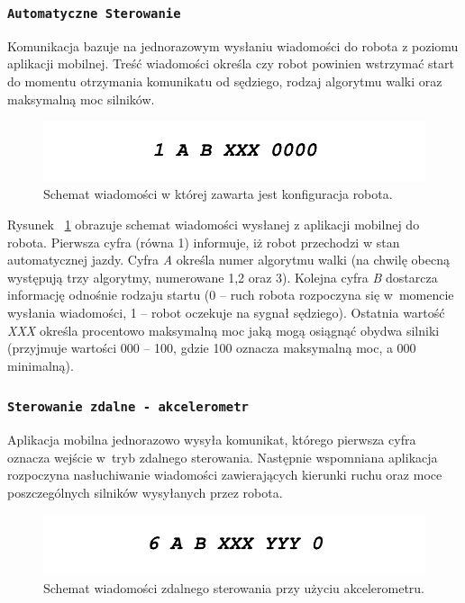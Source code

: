  \subsubsection{\lstinline$Automatyczne Sterowanie$}

Komunikacja bazuje na jednorazowym wysłaniu wiadomości do robota z poziomu aplikacji mobilnej. Treść wiadomości określa czy robot powinien wstrzymać start do momentu otrzymania komunikatu od sędziego, rodzaj algorytmu walki oraz maksymalną moc silników.

\begin{figure}[H]
	\centering
		\includegraphics[width=0.75\linewidth]{pic03/automatic.pdf}
	\caption{Schemat wiadomości w której zawarta jest konfiguracja robota.}
	\label{fig:automatic}	
\end{figure}

Rysunek ~\ref{fig:automatic} obrazuje schemat wiadomości wysłanej z aplikacji mobilnej do robota. Pierwsza cyfra (równa 1) informuje, iż robot przechodzi w stan automatycznej jazdy. Cyfra \textit{A} określa numer algorytmu walki (na chwilę obecną występują trzy algorytmy, numerowane 1,2 oraz 3). Kolejna cyfra \textit{B} dostarcza informację odnośnie rodzaju startu (0 – ruch robota rozpoczyna się w~momencie wysłania wiadomości, 1 – robot oczekuje na sygnał sędziego). Ostatnia wartość \textit{XXX} określa procentowo maksymalną moc jaką mogą osiągnąć obydwa silniki (przyjmuje wartości 000 – 100, gdzie 100 oznacza maksymalną moc, a 000 minimalną).

 \subsubsection{\lstinline$Sterowanie zdalne - akcelerometr$}

Aplikacja mobilna jednorazowo wysyła komunikat, którego pierwsza cyfra oznacza wejście w~tryb zdalnego sterowania. Następnie wspomniana aplikacja rozpoczyna nasłuchiwanie wiadomości zawierających kierunki ruchu oraz moce poszczególnych silników wysyłanych przez robota.

\begin{figure}[H]
	\centering
		\includegraphics[width=0.75\linewidth]{pic03/accelerometer.pdf}
	\caption{Schemat wiadomości zdalnego sterowania przy użyciu akcelerometru.}
	\label{fig:accelerometer}	
\end{figure}

